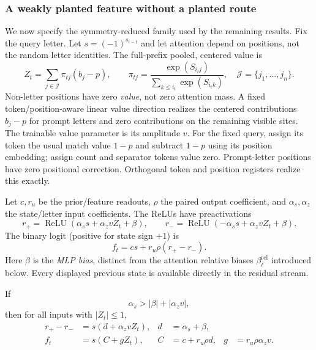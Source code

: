 \subsubsection{A weakly planted feature without a planted route}
\label{app:weak-routing-family}

We now specify the symmetry-reduced family used by the remaining results.
Fix the query letter. Let $s=(-1)^{s_{t-1}}$ and let attention depend on positions, not the
random letter identities.  The full-prefix pooled, centered value is
\begin{equation}\label{eq:lr-centered-value}
 Z_t=\sum_{j\in\mathcal J}\pi_{tj}(b_j-p),\qquad
 \pi_{tj}=\frac{\exp(S_{i_tj})}{\sum_{k\le i_t}\exp(S_{i_tk})},
 \quad \mathcal J=\{j_1,\ldots,j_n\}.
\end{equation}
Non-letter positions have zero \emph{value}, not zero attention mass.
A fixed token/position-aware linear value direction realizes the centered contributions
$b_j-p$ for prompt letters and zero contributions on the remaining visible
sites.  The trainable value parameter is its amplitude $v$. For the fixed query, assign its token the usual match
value $1-p$ and subtract $1-p$ using its position embedding; assign count
and separator tokens value zero. Prompt-letter positions have zero positional
correction. Orthogonal token and position registers realize this exactly.

Let $c,r_u$ be the prior/feature readouts, $\rho$ the paired output coefficient,
and $\alpha_s,\alpha_z$ the state/letter input coefficients. The ReLUs have preactivations
\begin{equation}\label{eq:lr-gates}
 r_+=\operatorname{ReLU}(\alpha_s s+\alpha_z vZ_t+\beta),\qquad
 r_-=\operatorname{ReLU}(-\alpha_s s+\alpha_z vZ_t+\beta).
\end{equation}
The binary logit (positive for state sign $+1$) is
\begin{equation}\label{eq:lr-factor-logit}
 f_t=cs+r_u\rho(r_+-r_-).
\end{equation}
Here $\beta$ is the \emph{MLP bias}, distinct from the attention
relative biases $\beta_\ell^{\mathrm{rel}}$ introduced below.
Every displayed previous state is available directly in the residual stream.

If
\begin{equation}\label{eq:lr-gate-condition}
 \alpha_s>|\beta|+|\alpha_z v|,
\end{equation}
then for all inputs with $|Z_t|\le1$,
\begin{equation}\label{eq:lr-feature-param}
 \begin{aligned}
 r_+-r_-&=s(d+{\alpha_z v} Z_t),& d&=\alpha_s+\beta,\\
 f_t&=s(C+gZ_t),& C&=c+r_u\rho d,& g&=r_u\rho {\alpha_z v}.
 \end{aligned}
\end{equation}

